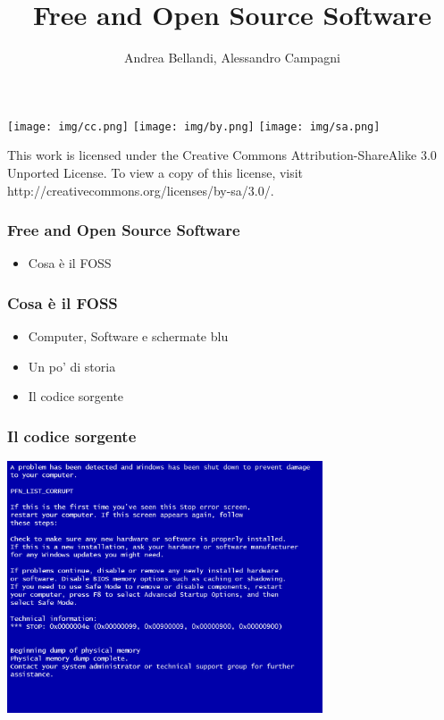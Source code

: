 \documentclass{beamer}
\title{Free and Open Source Software}
\author{Andrea Bellandi, Alessandro Campagni}
\begin{document}
\begin{frame}
  \titlepage

\vfill
\texttt{[image: img/cc.png]}
\texttt{[image: img/by.png]}
\texttt{[image: img/sa.png]}

This work is licensed under the Creative Commons
Attribution-ShareAlike 3.0 Unported License. 
To view a copy of this license, visit 
http://creativecommons.org/licenses/by-sa/3.0/.
\end{frame}

\begin{frame}
  \frametitle{Free and Open Source Software}

  \begin{itemize}
    \item Cosa \`e il FOSS
  \end{itemize}

\end{frame}


\begin{frame}
  \frametitle{Cosa \`e il FOSS}

  \begin{itemize}
    \item<1-> Computer, Software e schermate blu
    \item<2-> Un po' di storia
    \item<3-> Il codice sorgente
  \end{itemize}

\end{frame}


\begin{frame}
  \frametitle{Il codice sorgente}

  \begin{center}
      \includegraphics[width=0.7\textwidth]{img/bsod.jpg}
  \end{center}

\end{frame}
\end{document}
